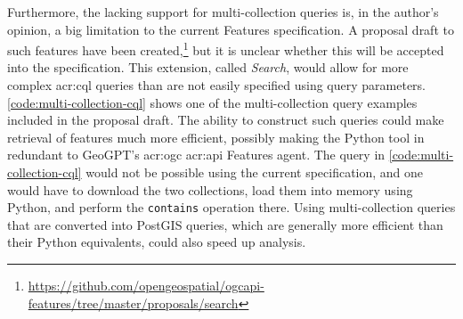 Furthermore, the lacking support for multi-collection queries is, in the author's opinion, a big limitation to the current Features specification. A proposal draft to such features have been created,\footnote{\url{https://github.com/opengeospatial/ogcapi-features/tree/master/proposals/search}} but it is unclear whether this will be accepted into the specification. This extension, called \textit{Search}, would allow for more complex \acrshort{acr:cql} queries than are not easily specified using query parameters. \autoref{code:multi-collection-cql} shows one of the multi-collection query examples included in the proposal draft. The ability to construct such queries could make retrieval of features much more efficient, possibly making the Python tool in redundant to GeoGPT's \acrshort{acr:ogc} \acrshort{acr:api} Features agent. The query in \autoref{code:multi-collection-cql} would not be possible using the current specification, and one would have to download the two collections, load them into memory using Python, and perform the \texttt{contains} operation there. Using multi-collection queries that are converted into PostGIS queries, which are generally more efficient than their Python equivalents, could also speed up analysis.


